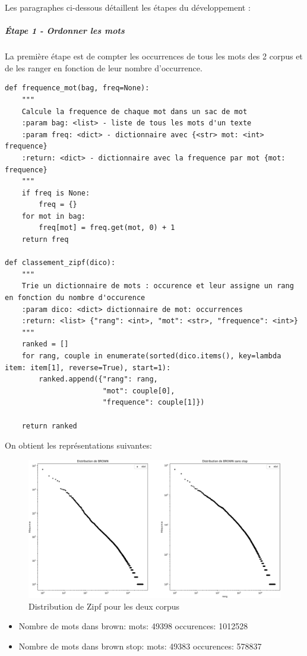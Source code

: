 \documentclass[a4paper,12pt]{article}
\begin{document}
		Les paragraphes ci-dessous détaillent les étapes du développement :
		
		\subparagraph{Étape 1 - Ordonner les mots}
			La première étape est de compter les occurrences de tous les mots des 2 corpus et de les ranger en fonction de leur nombre d’occurrence. 
			\begin{lstlisting}[title=Triage des mots]
def frequence_mot(bag, freq=None):
    """
    Calcule la frequence de chaque mot dans un sac de mot
    :param bag: <list> - liste de tous les mots d'un texte
    :param freq: <dict> - dictionnaire avec {<str> mot: <int> frequence}
    :return: <dict> - dictionnaire avec la frequence par mot {mot: frequence}
    """
    if freq is None:
        freq = {}
    for mot in bag:
        freq[mot] = freq.get(mot, 0) + 1
    return freq
		
def classement_zipf(dico):
    """
    Trie un dictionnaire de mots : occurence et leur assigne un rang en fonction du nombre d'occurence
    :param dico: <dict> dictionnaire de mot: occurrences
    :return: <list> {"rang": <int>, "mot": <str>, "frequence": <int>}
    """
    ranked = []
    for rang, couple in enumerate(sorted(dico.items(), key=lambda item: item[1], reverse=True), start=1):
        ranked.append({"rang": rang,
                       "mot": couple[0],
                       "frequence": couple[1]})

    return ranked \end{lstlisting}
    
    		
    		On obtient les représentations suivantes: 
		\begin{figure}[H]
				\includegraphics[width=\linewidth]{img/distribZipf.png}
				\caption{Distribution de Zipf pour les deux corpus}
		\end{figure}    		
    		
    		\begin{itemize}
    			\item Nombre de mots dans brown:	mots: 49398	occurences: 1012528
    			\item Nombre de mots dans brown stop:	mots: 49383	occurences: 578837\\
    		\end{itemize}
    		
\end{document}
